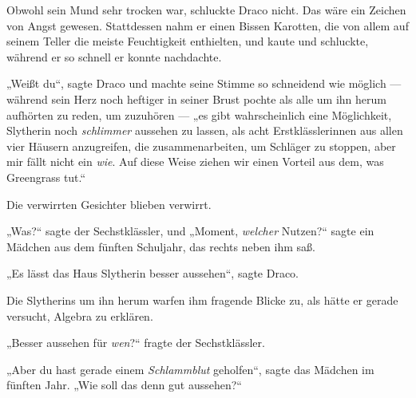 Obwohl sein Mund sehr trocken war, schluckte Draco nicht. Das wäre ein Zeichen von Angst gewesen. Stattdessen nahm er einen Bissen Karotten, die von allem auf seinem Teller die meiste Feuchtigkeit enthielten, und kaute und schluckte, während er so schnell er konnte nachdachte.

„Weißt du“, sagte Draco und machte seine Stimme so schneidend wie möglich — während sein Herz noch heftiger in seiner Brust pochte als alle um ihn herum aufhörten zu reden, um zuzuhören — „es gibt wahrscheinlich eine Möglichkeit, Slytherin noch \emph{schlimmer} aussehen zu lassen, als acht Erstklässlerinnen aus allen vier Häusern anzugreifen, die zusammenarbeiten, um Schläger zu stoppen, aber mir fällt nicht ein \emph{wie}. Auf diese Weise ziehen wir einen Vorteil aus dem, was Greengrass tut.“

Die verwirrten Gesichter blieben verwirrt.

„Was?“ sagte der Sechstklässler, und
„Moment, \emph{welcher} Nutzen?“ sagte ein Mädchen aus dem fünften Schuljahr, das rechts neben ihm saß.

„Es lässt das Haus Slytherin besser aussehen“, sagte Draco.

Die Slytherins um ihn herum warfen ihm fragende Blicke zu, als hätte er gerade versucht, Algebra zu erklären.

„Besser aussehen für \emph{wen}?“ fragte der Sechstklässler.

„Aber du hast gerade einem \emph{Schlammblut} geholfen“, sagte das Mädchen im fünften Jahr.
„Wie soll das denn gut aussehen?“

